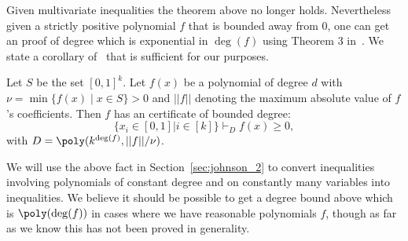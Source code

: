 Given multivariate inequalities the theorem above no longer holds. Nevertheless given a strictly positive polynomial $f$ that is bounded away from $0$, one can get an \sos proof of degree which is exponential in $\deg(f)$ using Theorem 3 in~\cite{schweighofer}. We state a corollary of~\cite{schweighofer} that is sufficient for our purposes. 

\begin{theorem}\label{thm:blackbox-sos}
Let $S$ be the set $[0,1]^k$. Let $f(x)$ be a polynomial of degree $d$ with $\nu = \min\{f(x) \mid x \in S\} > 0$ and $||f||$ denoting the maximum absolute value of $f$'s coefficients. Then $f$ has an \sos certificate of bounded degree:
\[\{x_i \in [0,1] | i \in [k]\} \vdash_D f(x) \geq 0,\]
with $D = \poly(k^{\deg(f)}, ||f||/\nu)$.
\end{theorem}

We will use the above fact in Section~\ref{sec:johnson_2} to convert inequalities involving polynomials of constant degree and on constantly many variables into \sos inequalities. We believe it should be possible to get a degree bound above which is $\poly(\deg(f))$ in cases where we have reasonable polynomials $f$, though as far as we know this has not been proved in generality.




